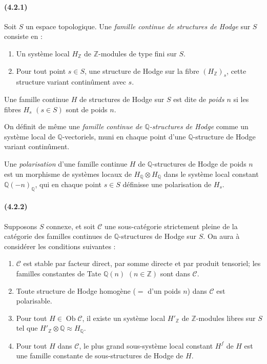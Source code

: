 \documentclass[10pt]{article}
\newcommand{\Q}{\mathbb Q}
\newcommand{\Z}{\mathbb Z}
\newcommand{\Ob}{\operatorname{Ob}}
\begin{document}
\paragraph{(4.2.1)} Soit $S$ un espace topologique. Une \emph{famille continue de structures de Hodge} sur $S$ consiste en :
\begin{enumerate}[label=\alph*)]
\item Un système local $H_\Z$ de $\Z$-modules de type fini sur $S$.
\item Pour tout point $s\in S$, une structure de Hodge sur la fibre $(H_\Z)_s$, cette structure variant continûment avec $s$.
\end{enumerate}
Une famille continue $H$ de structures de Hodge sur $S$ est dite de \emph{poids $n$} si les fibres $H_s$ $(s\in S)$ sont de poids $n$.

On définit de même une \emph{famille continue de $\Q$-structures de Hodge} comme un système local de $\Q$-vectoriels, muni en chaque point d'une $\Q$-structure de Hodge variant continûment.

Une \emph{polarisation} d'une famille continue $H$ de $\Q$-structures de Hodge de poids $n$ est un morphisme de systèmes locaux de $H_\Q\otimes H_\Q$ dans le système local constant $\Q(-n)_\Q$, qui en chaque point $s\in S$ définisse une polarisation de $H_s$.

\paragraph{(4.2.2)} Supposons $S$ connexe, et soit $\mathcal C$ une sous-catégorie strictement pleine de la catégorie des familles continues de $\Q$-structures de Hodge sur $S$. On aura à considérer les conditions suivantes :
\begin{enumerate}[label=(4.2.2.\arabic*)]
\item $\mathcal C$ est stable par facteur direct, par somme directe et par produit tensoriel; les familles constantes de Tate $\Q(n)$ $(n\in\Z)$ sont dans $\mathcal C$.
\item Toute structure de Hodge homogène ($={}$ d'un poids $n$) dans $\mathcal C$ est polarisable.
\item Pour tout $H\in\Ob\mathcal C$, il existe un système local $H'_\Z$ de $\Z$-modules libres sur $S$ tel que $H'_\Z\otimes\Q\approx H_\Q$.
\item Pour tout $H$ dans $\mathcal C$, le plus grand sous-système local constant $H^f$ de $H$ est une famille constante de sous-structures de Hodge de $H$.
\end{enumerate}
\end{document}
